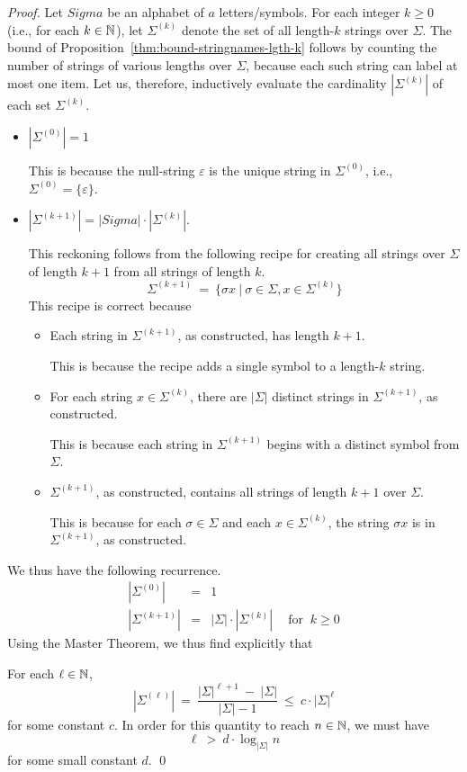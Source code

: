 \begin{proof}
Let $Sigma$ be an alphabet of $a$ letters/symbols.  For each integer
$k \geq 0$ (i.e., for each $k \in \mathbb{N}$), let $\Sigma^{(k)}$ denote the
set of all length-$k$ strings over $\Sigma$.  The bound of
Proposition~\ref{thm:bound-stringnames-lgth-k} follows by counting the
number of strings of various lengths over $\Sigma$, because each such
string can label at most one item.  Let us, therefore, inductively
evaluate the cardinality $|\Sigma^{(k)}|$ of each set $\Sigma^{(k)}$.
\begin{itemize}
\item
$|\Sigma^{(0)}| =1$

This is because the null-string $\varepsilon$ 
is the unique string in $\Sigma^{(0)}$, i.e., $\Sigma^{(0)} = \{
\varepsilon \}$.

\item
$|\Sigma^{(k+1)}| = |Sigma| \cdot |\Sigma^{(k)}|$.

This reckoning follows from the following recipe for creating all
strings over $\Sigma$ of length $k+1$ from all strings of length $k$.
\[
\Sigma^{(k+1)} \ = \ \{ \sigma x \ | \ \sigma \in \Sigma, x \in
\Sigma^{(k)} \}
\]
This recipe is correct because
  \begin{itemize}
  \item
Each string in $\Sigma^{(k+1)}$, as constructed, has length $k+1$.

This is because the recipe adds a single symbol to a length-$k$
string.
  \item
For each string $x \in \Sigma^{(k)}$, there are $|\Sigma|$ distinct
strings in $\Sigma^{(k+1)}$, as constructed.

This is because each string in $\Sigma^{(k+1)}$ begins with a distinct
symbol from $\Sigma$.

  \item
$\Sigma^{(k+1)}$, as constructed, contains all strings of length $k+1$
over $\Sigma$.

This is because for each $\sigma \in \Sigma$ and each $x \in
\Sigma^{(k)}$, the string $\sigma x$ is in $\Sigma^{(k+1)}$, as
constructed.
  \end{itemize}
\end{itemize}
We thus have the following recurrence.
\begin{eqnarray*}
|\Sigma^{(0)}| & = & 1 \\
|\Sigma^{(k+1)}| & = & |\Sigma| \cdot |\Sigma^{(k)}| \ \ \ \ 
\mbox{ for } \ k \geq 0
\end{eqnarray*}
Using the Master Theorem, we thus find explicitly that

\noindent
For each $\ell \in \mathbb{N}$,
\[ |\Sigma^{(\ell)}| \ = \ \frac{|\Sigma|^{\ell+1} \ - \ |\Sigma|}
{|\Sigma| -1} \ \leq \ c \cdot |\Sigma|^{\ell}
\]
for some constant $c$.  In order for this quantity to reach $n \in
\mathbb{N}$, we must have
\[ \ell \ > \ d \cdot \log_{|\Sigma|} n   \]
for some small constant $d$.  \qed
\end{proof}

